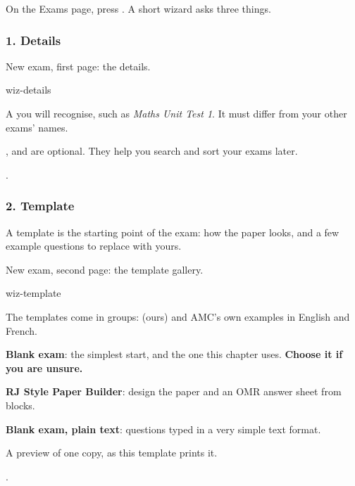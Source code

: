 \documentclass[11pt]{article}
\begin{document}
On the Exams page, press . A short wizard asks three things.

\subsubsection{1. Details}

\begin{keep}
\begin{guidefig}{New exam, first page: the details.}
\begin{shot}[0.86\linewidth]{wiz-details}
\end{shot}
\end{guidefig}
\begin{callouts}
  \item A  you will recognise, such as \emph{Maths Unit Test 1}. It must differ from your other exams' names.
  \item[\badge{2}--\badge{4}] ,  and  are optional. They help you search and sort your exams later.
  \setcounter{calloutsi}{4}
  \item {}.
\end{callouts}
\end{keep}

\subsubsection{2. Template}

A template is the starting point of the exam: how the paper looks, and a few example questions to replace with yours.

\begin{keep}
\begin{guidefig}{New exam, second page: the template gallery.}
\begin{shot}{wiz-template}
\end{shot}
\end{guidefig}
\begin{callouts}
  \item The templates come in groups:  (ours) and AMC's own examples in English and French.
  \item \textbf{Blank exam}: the simplest start, and the one this chapter uses. \textbf{Choose it if you are unsure.}
  \item \textbf{RJ Style Paper Builder}: design the paper and an OMR answer sheet from blocks.
  \item \textbf{Blank exam, plain text}: questions typed in a very simple text format.
  \item A preview of one copy, as this template prints it.
  \item {}.
\end{callouts}
\end{keep}
\end{document}
